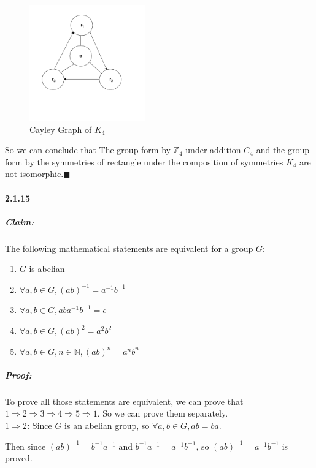 \documentclass[11pt]{article}
\begin{document}
    \begin{figure}[H]
        \begin{center}
        \includegraphics[width=5cm]{./imgs/K_4.png}
        \caption{Cayley Graph of $K_4$}
        \end{center}
    \end{figure}
		
	So we can conclude that The group form by $\mathbb{Z}_4$ under addition $C_4$ and the group form by the symmetries of rectangle under the composition of symmetries $K_4$ are not isomorphic.$\blacksquare$
\paragraph{2.1.15}
	\subparagraph{Claim:} The following mathematical statements are equivalent for a group $G$:
			\begin{enumerate}
				\item $G$ is abelian
				\item $\forall a,b \in G, (ab)^{-1} = a^{-1}b^{-1}$
				\item $\forall a,b \in G, aba^{-1}b^{-1} = e$
				\item $\forall a,b \in G, (ab)^{2} = a^{2}b^{2}$
				\item $\forall a,b \in G, n \in \mathbb{N}, (ab)^{n} = a^{n}b^{n}$
			\end{enumerate}
			
			\subparagraph{Proof:}
				To prove all those statements are equivalent, we can prove that $1 \Rightarrow 2 \Rightarrow 3 \Rightarrow 4 \Rightarrow 5 \Rightarrow 1$. So we can prove them separately.\\
				
				\textbf{$1 \Rightarrow 2$: } Since $G$ is an abelian group, so $\forall a, b \in G, ab = ba$.
				
				Then since $(ab)^{-1} = b^{-1}a^{-1}$ and $b^{-1}a^{-1} = a^{-1}b^{-1}$, so $(ab)^{-1} = a^{-1}b^{-1}$ is proved.\\
				
\end{document}

